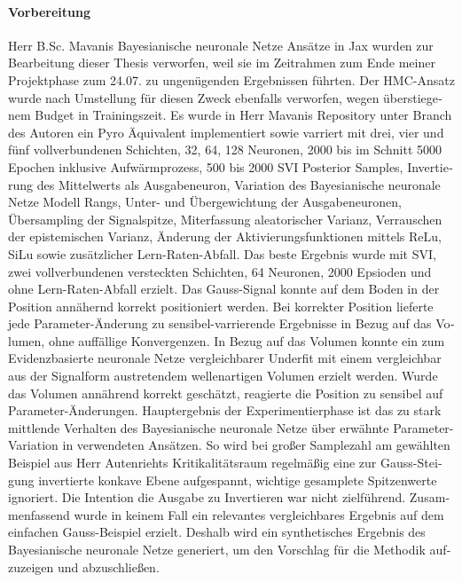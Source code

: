 \begin{otherlanguage}{ngerman}
{\paragraph{Vorbereitung} Herr B.Sc. Mavanis \gls{Bayesianische neuronale Netze} Ansätze in Jax wurden zur Bearbeitung dieser Thesis verworfen, weil sie im Zeitrahmen zum Ende meiner Projektphase zum 24.07. zu ungenügenden Ergebnissen führten. Der HMC-Ansatz wurde nach Umstellung für diesen Zweck ebenfalls verworfen, wegen überstiegenem Budget in Trainingszeit. Es wurde in Herr Mavanis Repository unter Branch des Autoren ein Pyro Äquivalent implementiert sowie varriert mit drei, vier und fünf vollverbundenen Schichten, 32, 64, 128 Neuronen, 2000 bis im Schnitt 5000 Epochen inklusive Aufwärmprozess, 500 bis 2000 SVI Posterior Samples, Invertierung des Mittelwerts als Ausgabeneuron, Variation des \gls{Bayesianische neuronale Netze} Modell Rangs, Unter- und Übergewichtung der Ausgabeneuronen, Übersampling der Signalspitze, Miterfassung aleatorischer Varianz, Verrauschen der epistemischen Varianz, Änderung der Aktivierungsfunktionen mittels ReLu, SiLu sowie zusätzlicher Lern-Raten-Abfall. Das beste Ergebnis wurde mit SVI, zwei vollverbundenen versteckten Schichten, 64 Neuronen, 2000 Epsioden und ohne Lern-Raten-Abfall erzielt. Das Gauss-Signal konnte auf dem Boden in der Position annähernd korrekt positioniert werden. Bei korrekter Position lieferte jede Parameter-Änderung zu sensibel-varrierende Ergebnisse in Bezug auf das Volumen, ohne auffällige Konvergenzen. In Bezug auf das Volumen konnte ein zum \gls{Evidenzbasierte neuronale Netze} vergleichbarer Underfit mit einem vergleichbar aus der Signalform austretendem wellenartigen Volumen erzielt werden. Wurde das Volumen annährend korrekt geschätzt, reagierte die Position zu sensibel auf Parameter-Änderungen. Hauptergebnis der Experimentierphase ist das zu stark mittlende Verhalten des \gls{Bayesianische neuronale Netze} über erwähnte Parameter-Variation in verwendeten Ansätzen. So wird bei großer Samplezahl am gewählten Beispiel aus Herr Autenriehts Kritikalitätsraum regelmäßig eine zur Gauss-Steigung invertierte konkave Ebene aufgespannt, wichtige gesamplete Spitzenwerte ignoriert. Die Intention die Ausgabe zu Invertieren war nicht zielführend. Zusammenfassend wurde in keinem Fall ein relevantes vergleichbares Ergebnis auf dem einfachen Gauss-Beispiel erzielt. Deshalb wird ein synthetisches Ergebnis des \gls{Bayesianische neuronale Netze} generiert, um den Vorschlag für die Methodik aufzuzeigen und abzuschließen.  



}
\end{otherlanguage}
